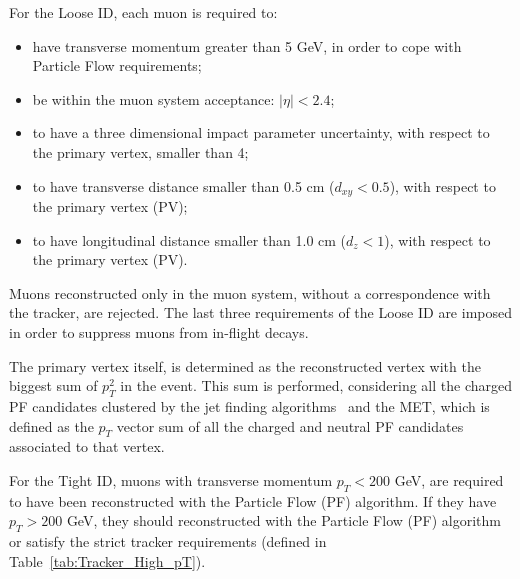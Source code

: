 For the Loose ID, each muon is required to:
\begin{itemize}
  \item have transverse momentum greater than 5 GeV, in order to cope with Particle Flow requirements;
  \item be within the muon system acceptance: $|\eta| < 2.4$;
  \item to have a three dimensional impact parameter uncertainty, with respect to the primary vertex, smaller than 4;
  \item to have transverse distance smaller than 0.5 cm ($d_{xy} < 0.5$), with respect to the primary vertex (PV);
  \item to have longitudinal distance smaller than 1.0 cm ($d_{z} < 1$), with respect to the primary vertex (PV).

\end{itemize}

Muons reconstructed only in the muon system, without a correspondence with the tracker, are rejected. The last three requirements of the Loose ID are imposed in order to suppress muons from in-flight decays.

The primary vertex itself, is determined as the reconstructed vertex with the biggest sum of $p_T^2$ in the event. This sum is performed, considering all the charged PF candidates clustered by the jet finding algorithms~\cite{Cacciari:2008gp,Cacciari:2011ma} and the MET, which is defined as the $p_T$ vector sum of all the charged and neutral PF candidates associated to that vertex. 

For the Tight ID, muons with transverse momentum $p_{T} < 200$ GeV, are required to have been reconstructed with the Particle Flow (PF) algorithm. If they have $p_{T} > 200$ GeV, they should reconstructed with the Particle Flow (PF) algorithm or satisfy the strict tracker requirements (defined in Table~\ref{tab:Tracker_High_pT}).

